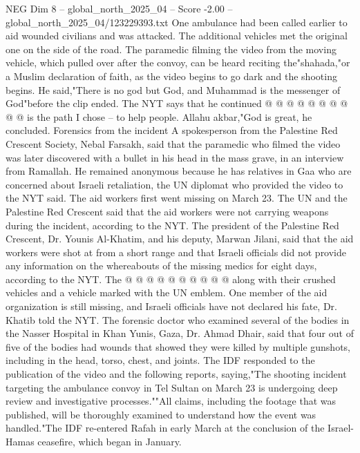 \begin{textsample}{NEG Dim 8 – global\_north\_2025\_04 – Score -2.00 – global\_north\_2025\_04/123229393.txt}
One ambulance had been called earlier to aid wounded civilians and was attacked.
The additional vehicles met the original one on the side of the road.
The paramedic filming the video from the moving vehicle, which pulled over after the convoy, can be heard reciting the"shahada,"or a Muslim declaration of faith, as the video begins to go dark and the shooting begins.
He said,"There is no god but God, and Muhammad is the messenger of God"before the clip ended.
The NYT says that he continued @ @ @ @ @ @ @ @ @ @ is the path I chose -- to help people.
Allahu akbar,"God is great, he concluded.
Forensics from the incident A spokesperson from the Palestine Red Crescent Society, Nebal Farsakh, said that the paramedic who filmed the video was later discovered with a bullet in his head in the mass grave, in an interview from Ramallah.
He remained anonymous because he has relatives in Gaa who are concerned about Israeli retaliation, the UN diplomat who provided the video to the NYT said.
The aid workers first went missing on March 23.
The UN and the Palestine Red Crescent said that the aid workers were not carrying weapons during the incident, according to the NYT.
The president of the Palestine Red Crescent, Dr.
Younis Al-Khatim, and his deputy, Marwan Jilani, said that the aid workers were shot at from a short range and that Israeli officials did not provide any information on the whereabouts of the missing medics for eight days, according to the NYT.
The @ @ @ @ @ @ @ @ @ @ along with their crushed vehicles and a vehicle marked with the UN emblem.
One member of the aid organization is still missing, and Israeli officials have not declared his fate, Dr.
Khatib told the NYT.
The forensic doctor who examined several of the bodies in the Nasser Hospital in Khan Yunis, Gaza, Dr.
Ahmad Dhair, said that four out of five of the bodies had wounds that showed they were killed by multiple gunshots, including in the head, torso, chest, and joints.
The IDF responded to the publication of the video and the following reports, saying,"The shooting incident targeting the ambulance convoy in Tel Sultan on March 23 is undergoing deep review and investigative processes.""All claims, including the footage that was published, will be thoroughly examined to understand how the event was handled."The IDF re-entered Rafah in early March at the conclusion of the Israel-Hamas ceasefire, which began in January.

\end{textsample}
